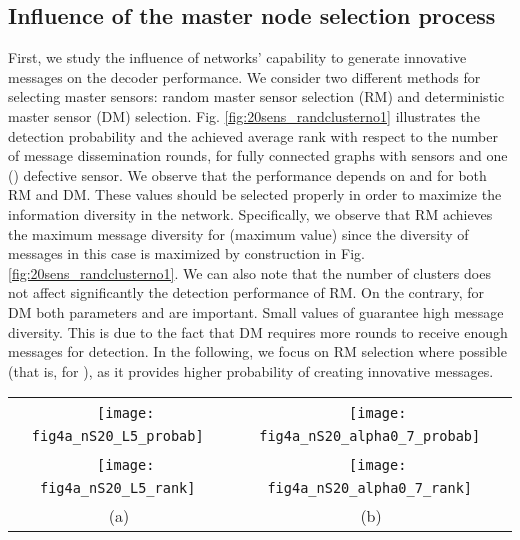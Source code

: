\documentclass[journal]{IEEEtran}
\begin{document}
\subsection{Influence of the master node selection process}
First, we study the influence of networks' capability to generate innovative messages on the decoder performance. We consider two different methods for selecting master sensors: random master sensor selection (RM) and deterministic master sensor (DM) selection. Fig. \ref{fig:20sens_randclusterno1} illustrates the detection probability and the achieved average rank with respect to the number of message dissemination rounds, for fully connected graphs with  sensors and one () defective sensor. We observe that the performance depends on  and  for both RM and DM. These values should be selected properly in order to maximize the information diversity in the network. Specifically, we observe that RM achieves the maximum message diversity for  (maximum value) since the diversity of messages in this case is maximized by construction in Fig. \ref{fig:20sens_randclusterno1}. We can also note that the number of clusters does not affect significantly the detection performance of RM. On the contrary, for DM both parameters  and  are important. Small values of  guarantee high message diversity. This is due to the fact that DM requires more rounds to receive enough messages for detection. In the following, we focus on RM selection where possible (that is, for ), as it provides higher probability of creating innovative messages. 
\begin{figure*}[thb]
\begin{center}
\begin{tabular}{cc}
~\texttt{[image: fig4a\_nS20\_L5\_probab]}~&
~\texttt{[image: fig4a\_nS20\_alpha0\_7\_probab]}~\\
~\texttt{[image: fig4a\_nS20\_L5\_rank]}~&
~\texttt{[image: fig4a\_nS20\_alpha0\_7\_rank]}~\\
~(a) ~&~(b) ~\\ 
\end{tabular}
\end{center}
\caption{Simulation results for fully connected graphs with  sensors, , where RM and DM denote the random and deterministic selection mode of master sensors, respectively. Top row: Probability of defective sensor detection. Bottom row: Average rank of messages received per sensor. Column (a): fixed values of the master sensors (). Column (b): fixed values of the sensor participation constant ().}
\label{fig:20sens_randclusterno1}
\end{figure*}
\end{document}
